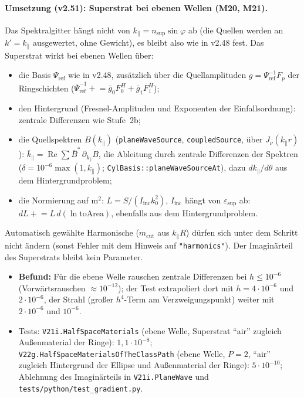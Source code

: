 \paragraph{Umsetzung (v2.51): Superstrat bei ebenen Wellen (M20, M21).}
Das Spektralgitter hängt nicht von $k_\parallel=n_{\text{sup}}\sin\varphi$ ab (die Quellen werden an $k'=k_\parallel$ ausgewertet,
ohne Gewicht), es bleibt also wie in v2.48 fest. Das Superstrat wirkt bei ebenen Wellen über:
\begin{itemize}[nosep]
  \item die Basis $\Psi_{\text{ref}}$ wie in v2.48, zusätzlich über die Quellamplituden $g=\Psi_{\text{ref}}^{-1}F_p$ der
        Ringschichten ($\bar\Psi^{-1}_{\text{ref}}\mathrel{+}=\bar g_0F_0^H+\bar g_1F_1^H$);
  \item den Hintergrund (Fresnel-Amplituden und Exponenten der Einfallsordnung): zentrale Differenzen wie Stufe~2b;
  \item die Quellspektren $B(k_\parallel)$ (\verb|planeWaveSource|, \verb|coupledSource|, über $J_\nu(k_\parallel r)$):
        $\bar k_\parallel=\operatorname{Re}\sum\bar B^*\,\partial_{k_\parallel}B$, die Ableitung durch zentrale Differenzen
        der Spektren ($\delta=10^{-6}\max(1,k_\parallel)$; \verb|CylBasis::planeWaveSourceAt|), dazu
        $dk_\parallel/d\theta$ aus dem Hintergrundproblem;
  \item die Normierung auf \textmu m$^2$: $L=S/(I_{\text{inc}}k_0^2)$, $I_{\text{inc}}$ hängt von $\varepsilon_{\text{sup}}$ ab:
        $dL\mathrel{+}=L\,d(\ln\text{toArea})$, ebenfalls aus dem Hintergrundproblem.
\end{itemize}
Automatisch gewählte Harmonische ($m_{\text{cut}}$ aus $k_\parallel R$) dürfen sich unter dem Schritt nicht ändern (sonst
Fehler mit dem Hinweis auf \verb|"harmonics"|). Der Imaginärteil des Superstrats bleibt kein Parameter.
\begin{itemize}[nosep]
  \item \textbf{Befund:} Für die ebene Welle rauschen zentrale Differenzen bei $h\le10^{-6}$ (Vorwärtsrauschen
        $\approx10^{-12}$); der Test extrapoliert dort mit $h=4\cdot10^{-6}$ und $2\cdot10^{-6}$, der Strahl (großer $h^4$-Term
        am Verzweigungspunkt) weiter mit $2\cdot10^{-6}$ und $10^{-6}$.
  \item Tests: \verb|V21i.HalfSpaceMaterials| (ebene Welle, Superstrat \enquote{air} zugleich Außenmaterial der Ringe):
        $1{,}1\cdot10^{-8}$; \verb|V22g.HalfSpaceMaterialsOfTheClassPath| (ebene Welle, $P=2$, \enquote{air} zugleich
        Hintergrund der Ellipse und Außenmaterial der Ringe): $5\cdot10^{-10}$; Ablehnung des Imaginärteils in
        \verb|V21i.PlaneWave| und \verb|tests/python/test_gradient.py|.
\end{itemize}

